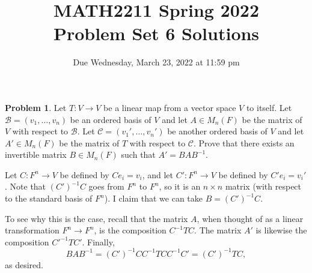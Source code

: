 \documentclass[11pt,oneside]{amsart}
\title{MATH2211 Spring 2022\\
Problem Set 6 Solutions}
\author{Due Wednesday, March 23, 2022 at 11:59 pm}
\theoremstyle{definition}
\newtheorem{problem}{Problem}
\begin{document}
    \maketitle
    
    \begin{problem}
        Let $T\colon V\to V$ be a linear map from a vector space $V$ to itself. Let $\mathcal B=(v_1,\dots,v_n)$ be an ordered basis of $V$ and let $A\in M_n(F)$ be the matrix of $V$ with respect to $\mathcal B$. Let $\mathcal C=(v_1',\dots,v_n')$ be another ordered basis of $V$ and let $A'\in M_n(F)$ be the matrix of $T$ with respect to $\mathcal C$. Prove that there exists an invertible matrix $B\in M_n(F)$ such that $A'=BAB^{-1}$.
    \end{problem}
    \begin{solution}
        Let $C\colon F^n\to V$ be defined by $Ce_i=v_i$, and let $C'\colon F^n\to V$ be defined by $C'e_i=v_i'$. Note that $(C')^{-1}C$ goes from $F^n$ to $F^n$, so it is an $n\times n$ matrix (with respect to the standard basis of $F^n$). I claim that we can take $B=(C')^{-1}C$.

        To see why this is the case, recall that the matrix $A$, when thought of as a linear transformation $F^n\to F^n$, is the composition $C^{-1}TC$. The matrix $A'$ is likewise the composition $C'^{-1}TC'$. Finally,
        \[BAB^{-1}=(C')^{-1}CC^{-1}TCC^{-1}C'=(C')^{-1}TC,\]
        as desired.
    \end{solution}
\end{document}
